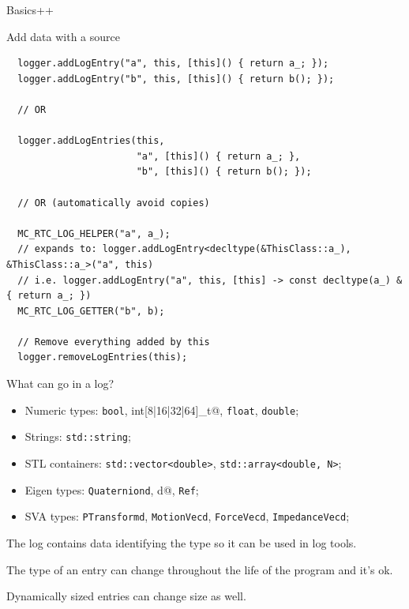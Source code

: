 \documentclass[c,aspectratio=169]{beamer}
\begin{document}
\begin{frame}[fragile]{Basics++}

  \vspace{-0.5em}
\scriptsize
  \begin{block}{Add data with a source}

\begin{verbatim}
  logger.addLogEntry("a", this, [this]() { return a_; });
  logger.addLogEntry("b", this, [this]() { return b(); });

  // OR

  logger.addLogEntries(this,
                       "a", [this]() { return a_; },
                       "b", [this]() { return b(); });

  // OR (automatically avoid copies)

  MC_RTC_LOG_HELPER("a", a_);
  // expands to: logger.addLogEntry<decltype(&ThisClass::a_), &ThisClass::a_>("a", this)
  // i.e. logger.addLogEntry("a", this, [this] -> const decltype(a_) & { return a_; })
  MC_RTC_LOG_GETTER("b", b);

  // Remove everything added by this
  logger.removeLogEntries(this);

\end{verbatim}

  \end{block}

\end{frame}

\begin{frame}[fragile]{What can go in a log?}

  \begin{itemize}
    \item Numeric types: \verb|bool|, \verb@[u]int[8|16|32|64]_t@, \verb|float|, \verb|double|;
    \item Strings: \verb|std::string|;
    \item STL containers: \verb|std::vector<double>|, \verb|std::array<double, N>|;
    \item Eigen types: \verb|Quaterniond|, \verb@Vector[2|3|6|X]d@, \verb|Ref|;
    \item SVA types: \verb|PTransformd|, \verb|MotionVecd|, \verb|ForceVecd|, \verb|ImpedanceVecd|;
  \end{itemize}

  \bigskip

  The log contains data identifying the type so it can be used in log tools.

  \medskip

  The type of an entry can change throughout the life of the program and it's ok.

  \medskip

  Dynamically sized entries can change size as well.

\end{frame}
\end{document}

